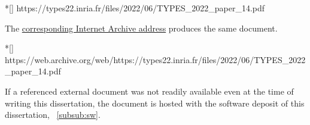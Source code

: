 \begin{center}
\begin{minipage}{\textwidth}
\begin{cmdlisting}*[]
https://types22.inria.fr/files/2022/06/TYPES_2022_paper_14.pdf
\end{cmdlisting}
\end{minipage}
\end{center}

The \href{https://web.archive.org/web/https://types22.inria.fr/files/2022/06/TYPES_2022_paper_14.pdf}{corresponding Internet Archive address} produces the same document.

\begin{center}
\begin{minipage}{\textwidth}
\begin{cmdlisting}*[]
https://web.archive.org/web/https://types22.inria.fr/files/2022/06/TYPES_2022_paper_14.pdf
\end{cmdlisting}
\end{minipage}
\end{center}

If a referenced external document was not readily available even at the time of writing this dissertation,
the document is hosted with the software deposit of this dissertation, \cf~\autoref{subsub:sw}.

